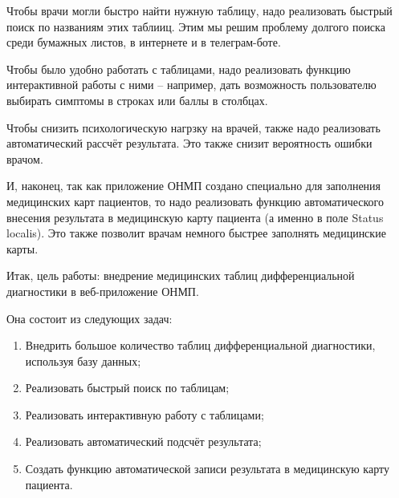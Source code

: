 Чтобы врачи могли быстро найти нужную таблицу, надо реализовать быстрый поиск по названиям этих таблииц. Этим мы решим проблему долгого поиска среди бумажных листов, в интернете и в телеграм-боте.

Чтобы было удобно работать с таблицами, надо реализовать функцию интерактивной работы с ними -- например, дать возможность пользователю выбирать симптомы в строках или баллы в столбцах.

Чтобы снизить психологическую нагрзку на врачей, также надо реализовать автоматический рассчёт результата. Это также снизит вероятность ошибки врачом.

И, наконец, так как приложение ОНМП создано специально для заполнения медицинских карт пациентов, то надо реализовать функцию автоматического внесения результата в медицинскую карту пациента (а именно в поле Status localis). Это также позволит врачам немного быстрее заполнять медицинские карты.

Итак, цель работы: внедрение медицинских таблиц дифференциальной диагностики в веб-приложение ОНМП.

Она состоит из следующих задач:

\begin{enumerate}
  \item Внедрить большое количество таблиц дифференциальной диагностики, используя базу данных;
  \item Реализовать быстрый поиск по таблицам;
  \item Реализовать интерактивную работу с таблицами;
  \item Реализовать автоматический подсчёт результата;
  \item Создать функцию автоматической записи результата в медицинскую карту пациента.
\end{enumerate}


